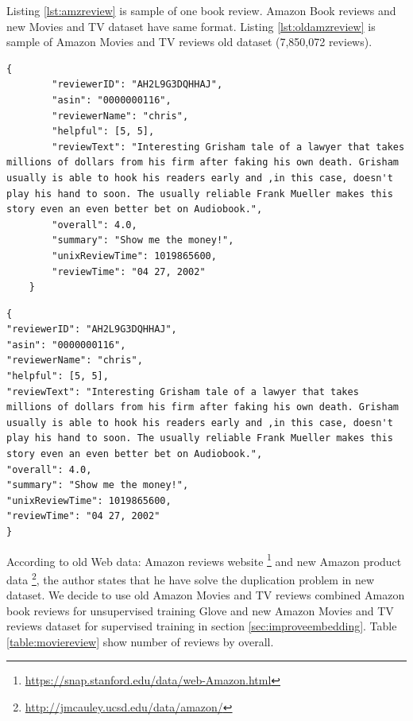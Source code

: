 Listing \ref{lst:amzreview} is sample of one book review. Amazon Book reviews and new Movies and TV dataset  have same format. Listing \ref{lst:oldamzreview} is sample of Amazon Movies and TV reviews old dataset (7,850,072 reviews). 

\begin{lstlisting}[caption={Amazon reviews sample},label={lst:amzreview}]
	{
		"reviewerID": "AH2L9G3DQHHAJ",
		"asin": "0000000116",
		"reviewerName": "chris",
		"helpful": [5, 5],
		"reviewText": "Interesting Grisham tale of a lawyer that takes millions of dollars from his firm after faking his own death. Grisham usually is able to hook his readers early and ,in this case, doesn't play his hand to soon. The usually reliable Frank Mueller makes this story even an even better bet on Audiobook.",
		"overall": 4.0,
		"summary": "Show me the money!",
		"unixReviewTime": 1019865600,
		"reviewTime": "04 27, 2002"
	}
\end{lstlisting}

\begin{lstlisting}[caption={Old Amazon reviews sample},label={lst:oldamzreview}]
{
"reviewerID": "AH2L9G3DQHHAJ",
"asin": "0000000116",
"reviewerName": "chris",
"helpful": [5, 5],
"reviewText": "Interesting Grisham tale of a lawyer that takes millions of dollars from his firm after faking his own death. Grisham usually is able to hook his readers early and ,in this case, doesn't play his hand to soon. The usually reliable Frank Mueller makes this story even an even better bet on Audiobook.",
"overall": 4.0,
"summary": "Show me the money!",
"unixReviewTime": 1019865600,
"reviewTime": "04 27, 2002"
}
\end{lstlisting}

According to old Web data: Amazon reviews website  \footnote{\url{https://snap.stanford.edu/data/web-Amazon.html}} and new Amazon product data \footnote{\url{http://jmcauley.ucsd.edu/data/amazon/}}, the author states that he have solve the duplication problem in new dataset. We decide to use old Amazon Movies and TV reviews combined Amazon book reviews for unsupervised training Glove and new Amazon Movies and TV reviews dataset for supervised training in section \ref{sec:improveembedding}. Table \ref{table:moviereview} show number of reviews by overall.

